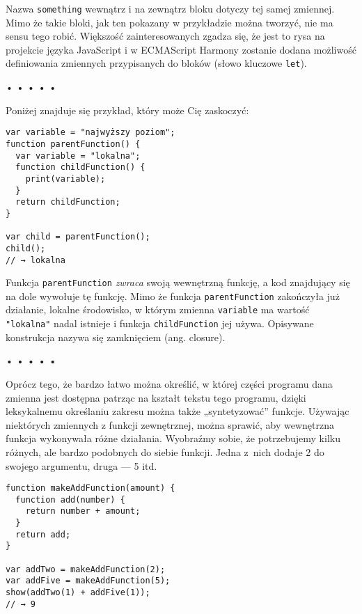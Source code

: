 Nazwa \texttt{something} wewnątrz i na zewnątrz bloku dotyczy tej samej zmiennej. Mimo że takie bloki, jak ten pokazany w przykładzie można tworzyć, nie ma sensu tego robić. Większość zainteresowanych zgadza się, że jest to rysa na projekcie języka JavaScript i w ECMAScript Harmony zostanie dodana możliwość definiowania zmiennych przypisanych do bloków (słowo kluczowe \texttt{let}).

  
  
\begin{center}
• • • • •
\end{center}
  
    
Poniżej znajduje się przykład, który może Cię zaskoczyć:

    
\begin{verbatim} 
var variable = "najwyższy poziom";
function parentFunction() {
  var variable = "lokalna";
  function childFunction() {
    print(variable);
  }
  return childFunction;
}

var child = parentFunction();
child();
// → lokalna
\end{verbatim}
    
Funkcja \texttt{parentFunction} \emph{zwraca} swoją wewnętrzną funkcję, a kod znajdujący się na dole wywołuje tę funkcję. Mimo że funkcja \texttt{parentFunction} zakończyła już działanie, lokalne środowisko, w którym zmienna \texttt{variable} ma wartość \texttt{"lokalna"} nadal istnieje i funkcja \texttt{childFunction} jej używa. Opisywane konstrukcja nazywa się zamknięciem (ang. closure).

  
  
\begin{center}
• • • • •
\end{center}
  
    
Oprócz tego, że bardzo łatwo można określić, w której części programu dana zmienna jest dostępna patrząc na kształt tekstu tego programu, dzięki leksykalnemu określaniu zakresu można także „syntetyzować” funkcje. Używając niektórych zmiennych z funkcji zewnętrznej, można sprawić, aby wewnętrzna funkcja wykonywała różne działania. Wyobraźmy sobie, że potrzebujemy kilku różnych, ale bardzo podobnych do siebie funkcji. Jedna z~nich dodaje 2 do swojego argumentu, druga — 5 itd.

    
\begin{verbatim} 
function makeAddFunction(amount) {
  function add(number) {
    return number + amount;
  }
  return add;
}

var addTwo = makeAddFunction(2);
var addFive = makeAddFunction(5);
show(addTwo(1) + addFive(1));
// → 9
\end{verbatim}
    
